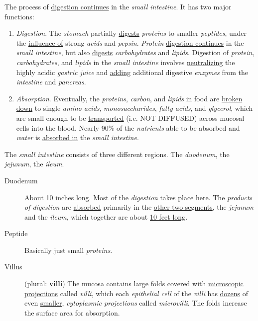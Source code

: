 \documentclass[11pt]{article}
\begin{document}
The process of \uline{digestion continues} in the \emph{small intestine}. It has two major
functions:
\begin{enumerate}
\item \emph{Digestion}. The \emph{stomach} partially \uline{digests} \emph{proteins} to smaller \emph{peptides}, under
the \uline{influence of} strong \emph{acids} and \emph{pepsin}. \emph{Protein} \uline{digestion continues} in the
\emph{small intestine}, but also \uline{digests} \emph{carbohydrates} and \emph{lipids}. Digestion of
\emph{protein}, \emph{carbohydrates}, and \emph{lipids} in the \emph{small intestine} involves
\uline{neutralizing} the highly acidic \emph{gastric juice} and \uline{adding} additional digestive
\emph{enzymes} from the \emph{intestine} and \emph{pancreas}.
\item \emph{Absorption}. Eventually, the \emph{proteins}, \emph{carbon}, and \emph{lipids} in food are \uline{broken
down} to single \emph{amino acids}, \emph{monosaccharides}, \emph{fatty acids}, and \emph{glycerol}, which
are small enough to be \uline{transported} (i.e. NOT DIFFUSED) across mucosal cells
into the blood. Nearly 90\% of the \emph{nutrients} able to be absorbed and \emph{water} is
\uline{absorbed in} the \emph{small intestine}.
\end{enumerate}


The \emph{small intestine} consists of three different regions. The \emph{duodenum}, the
\emph{jejunum}, the \emph{ileum}.

\begin{description}
\item[{Duodenum}] About \uline{10 inches long}. Most of the \emph{digestion} \uline{takes place} here. The
\emph{products of digestion} are \uline{absorbed} primarily in the \uline{other two segments}, the
\emph{jejunum} and the \emph{ileum}, which together are about \uline{10 feet long}.
\item[{Peptide}] Basically just small \emph{proteins}.
\item[{Villus}] (plural: \textbf{villi}) The mucosa contains large folds covered with
\uline{microscopic projections} called \emph{villi}, which each \emph{epithelial cell} of the
\emph{villi} has \uline{dozens} of even \uline{smaller}, \emph{cytoplasmic projections} called
\emph{microvilli}. The folds increase the surface area for absorption.
\end{description}
\end{document}
